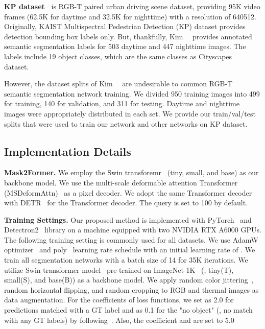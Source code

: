 \documentclass[10pt,twocolumn,letterpaper]{article}
\begin{document}
\textbf{KP dataset~\cite{hwang2015multispectral}} is RGB-T paired urban driving scene dataset, providing 95K video frames (62.5K for daytime and 32.5K for nighttime) with a resolution of 640512.
Originally, KAIST Multispectral Pedestrian Detection (KP) dataset provides detection bounding box labels only.
But, thankfully, Kim~\etal~\cite{kim2021ms} provides annotated semantic segmentation labels for 503 daytime and 447 nighttime images.
The labels include 19 object classes, which are the same classes as Cityscapes~\cite{cordts2016cityscapes} dataset.

However, the dataset splits of Kim~\etal~\cite{kim2021ms} are undesirable to common RGB-T semantic segmentation network training.
We divided 950 training images into 499 for training, 140 for validation, and 311 for testing. 
Daytime and nighttime images were appropriately distributed in each set.
We provide our train/val/test splits that were used to train our network and other networks on KP dataset.

\subsection{Implementation Details}
\label{subsec:impl_detail}
\textbf{Mask2Former.} We employ the Swin transforemr~\cite{liu2021swin} (tiny, small, and base) as our backbone model.
We use the multi-scale deformable attention Transformer (MSDeformAttn)~\cite{zhu2020deformable} as a pixel decoder.
We adopt the same Transformer decoder with DETR~\cite{carion2020end} for the Transformer decoder. 
The query  is set to 100 by default.

\textbf{Training Settings.} 
Our proposed method is implemented with PyTorch~\cite{paszke2019pytorch} and Detectron2~\cite{wu2019detectron2} library on a machine equipped with two NVIDIA RTX A6000 GPUs. 
The following training setting is commonly used for all datasets.
We use AdamW optimizer~\cite{loshchilovdecoupled} and poly~\cite{chen2017deeplab} learning rate schedule with an initial learning rate of .
We train all segmentation networks with a batch size of 14 for 35K iterations.
We utilize Swin transformer model~\cite{liu2021swin} pre-trained on ImageNet-1K~\cite{russakovsky2015imagenet} (\ie, tiny(T), small(S), and base(B)) as a backbone model. 
We apply random color jittering~\cite{liu2016ssd}, random horizontal flipping, and random cropping to RGB and thermal images as data augmentation.
For the coefficients of loss functions, we set  as 2.0 for predictions matched with a GT label and as 0.1 for the "no object" (\ie, no match with any GT labels) by following~\cite{cheng2022masked}.
Also, the coefficient  and  are set to 5.0
\end{document}
